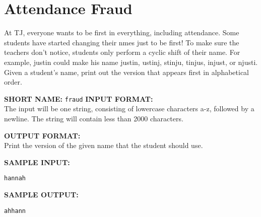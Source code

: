 \documentclass[twoside]{article}
\newcommand{\blank}{\vskip 3mm}
\begin{document}



\section{Attendance Fraud}

 At TJ, everyone wants to be first in everything, including attendance.  Some students have started changing their nmes just to be first!  To make sure the teachers don't notice, students only perform a cyclic shift of their name.  For example, justin could make his name justin, ustinj, stinju, tinjus, injust, or njusti.  Given a student's name, print out the version that appears first in alphabetical order.

\blank

\textbf{SHORT NAME:} \verb|fraud|
\blank
\textbf{INPUT FORMAT:}\\
The input will be one string, consisting of lowercase characters a-z, followed by a newline.  The string will contain less than 2000 characters.

\blank
\textbf{OUTPUT FORMAT:}\\

Print the version of the given name that the student should use.

\blank
\textbf{SAMPLE INPUT:}
\begin{verbatim}
hannah
\end{verbatim}


\textbf{SAMPLE OUTPUT:}
\begin{verbatim}
ahhann
\end{verbatim}
\end{document}

